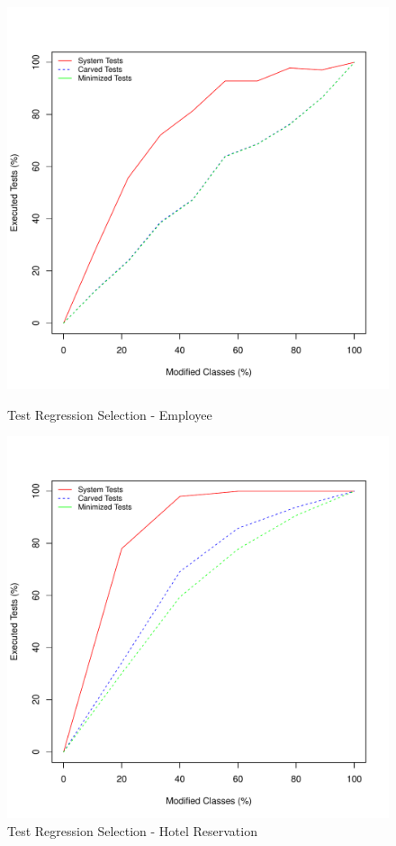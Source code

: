 \documentclass[10pt,conference]{IEEEtran}
\begin{document}
\begin{figure}[t]
\centering
\begin{minipage}[b]{.45\textwidth}
\includegraphics[width=\columnwidth]{figures/employee-rts-size}
\caption{Test Regression Selection - Employee}
\end{minipage}\hfill
\begin{minipage}[b]{.45\textwidth}
\includegraphics[width=\columnwidth]{figures/hotelme-rts-size}
\caption{Test Regression Selection - Hotel Reservation}
\end{minipage}
\end{figure}
\end{document}
